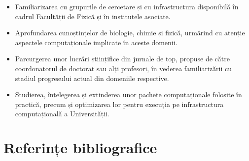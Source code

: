 \begin{itemize}
    \item Familiarizarea cu grupurile de cercetare și cu infrastructura disponibilă în cadrul Facultății de Fizică și în institutele asociate.

    \item Aprofundarea cunoștințelor de biologie, chimie și fizică, urmărind cu atenție aspectele computaționale implicate în aceste domenii.

    \item Parcurgerea unor lucrări științifice din jurnale de top, propuse de către coordonatorul de doctorat sau alți profesori, în vederea familiarizării cu stadiul progresului actual din domeniile respective.

    \item Studierea, înțelegerea și extinderea unor pachete computaționale folosite în practică, precum și optimizarea lor pentru execuția pe infrastructura computațională a Universității.
\end{itemize}

\clearpage

\section*{Referințe bibliografice}

\nocite{*}

\printbibliography[heading=none]

\clearpage
